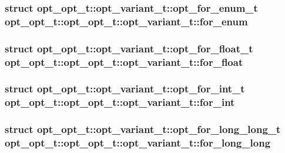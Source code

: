 \subsubsection[{for\_\-enum}]{\setlength{\rightskip}{0pt plus 5cm}struct {\bf opt\_\-opt\_\-t::opt\_\-variant\_\-t::opt\_\-for\_\-enum\_\-t}  opt\_\-opt\_\-t::opt\_\-opt\_\-t::opt\_\-variant\_\-t::for\_\-enum}\label{unionopt__opt__t_1_1opt__variant__t_c6b61de36522b0b8b59fd8605aa8e957}


\subsubsection[{for\_\-float}]{\setlength{\rightskip}{0pt plus 5cm}struct {\bf opt\_\-opt\_\-t::opt\_\-variant\_\-t::opt\_\-for\_\-float\_\-t}  opt\_\-opt\_\-t::opt\_\-opt\_\-t::opt\_\-variant\_\-t::for\_\-float}\label{unionopt__opt__t_1_1opt__variant__t_aaa975d08e5852f8af4e75ca17a1dacf}


\subsubsection[{for\_\-int}]{\setlength{\rightskip}{0pt plus 5cm}struct {\bf opt\_\-opt\_\-t::opt\_\-variant\_\-t::opt\_\-for\_\-int\_\-t}  opt\_\-opt\_\-t::opt\_\-opt\_\-t::opt\_\-variant\_\-t::for\_\-int}\label{unionopt__opt__t_1_1opt__variant__t_514b909a1f1bfb11cc8f06d27b34dd7b}


\subsubsection[{for\_\-long\_\-long}]{\setlength{\rightskip}{0pt plus 5cm}struct {\bf opt\_\-opt\_\-t::opt\_\-variant\_\-t::opt\_\-for\_\-long\_\-long\_\-t}  opt\_\-opt\_\-t::opt\_\-opt\_\-t::opt\_\-variant\_\-t::for\_\-long\_\-long}\label{unionopt__opt__t_1_1opt__variant__t_4d073459e8f71e23b03912a0fcc712fd}


